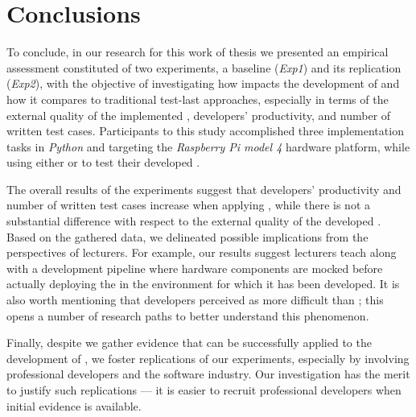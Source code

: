 \chapter{Conclusions}
\label{chap:7_conclusions}
To conclude, in our research for this work of thesis we presented an empirical assessment constituted of two experiments, a baseline (\textit{Exp1}) and its replication (\textit{Exp2}), with the objective of investigating how \tdd impacts the development of \ess and how it compares to traditional test-last approaches, especially in terms of the external quality of the implemented \es, developers' productivity, and number of written test cases. 
Participants to this study accomplished three implementation tasks in \textit{Python} and targeting the \textit{Raspberry Pi model 4} hardware platform, while using either \tdd or \notdd to test their developed \ess.

The overall results of the experiments suggest that developers' productivity and number of written test cases increase when applying \tdd, while there is not a substantial difference with respect to the external quality of the developed \ess.
Based on the gathered data, we delineated possible implications from the perspectives of lecturers. For example, our results suggest lecturers teach \tdd along with a development pipeline where hardware components are mocked before actually deploying the \es in the environment for which it has been developed. It is also worth mentioning that developers perceived \tdd as more difficult than \notdd; this opens a number of research paths to better understand this phenomenon.

Finally, despite we gather evidence that \tdd can be successfully applied to the development of \ess, we foster replications of our experiments, especially by involving professional developers and the software industry. 
Our investigation has the merit to justify such replications — it is easier to recruit professional developers when initial evidence is available. 